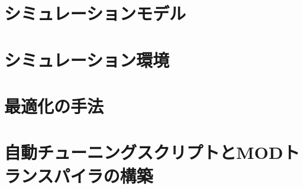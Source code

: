 \section{シミュレーションモデル}


\section{シミュレーション環境}


\section{最適化の手法}


\section{自動チューニングスクリプトとMODトランスパイラの構築}

